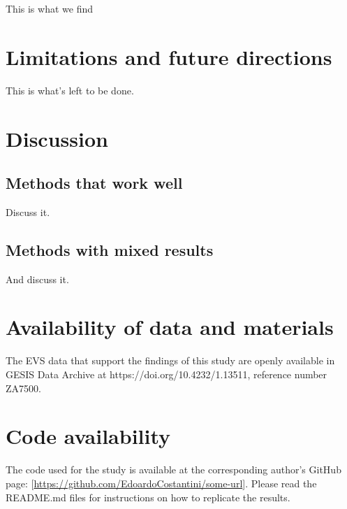 \documentclass[a4paper,doc,floatsintext,natbib]{apa6}\usepackage[]{graphicx}\usepackage[]{xcolor}
\newcommand{\pathBIB}{./bib}
\begin{document}
	This is what we find
    
\section{Limitations and future directions}

	This is what's left to be done.
    
\section{Discussion}

\subsection{Methods that work well}

	Discuss it.

\subsection{Methods with mixed results}

	And discuss it.
    
    \setcounter{secnumdepth}{4}

    \section{Availability of data and materials}

    The EVS data that support the findings of this study are openly available in GESIS Data Archive at https://doi.org/10.4232/1.13511, reference number ZA7500.
    
    \section{Code availability}

    The code used for the study is available at the corresponding author's GitHub page: [\url{https://github.com/EdoardoCostantini/some-url}].
    Please read the README.md files for instructions on how to replicate the results.

    



\end{document}

